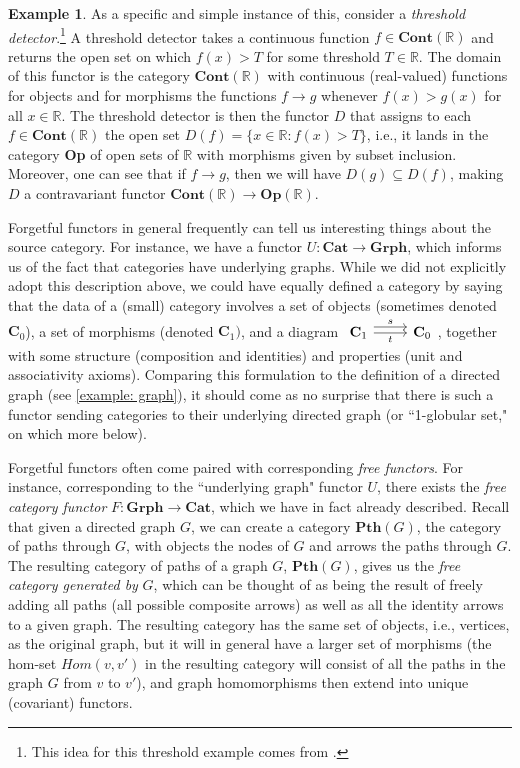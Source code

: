 \documentclass[a4paper]{book}
\theoremstyle{definition}
\newtheorem{example}{Example}[section]
\theoremstyle{definition}
\theoremstyle{definition}
\theoremstyle{theorem}
\theoremstyle{definition}
\begin{document}
\begin{example}
	As a specific and simple instance of this, consider a \textit{threshold detector}.\footnote{This idea for this threshold example comes from \cite{robinson_topological_2014}.} A threshold detector takes a continuous function $f \in \textbf{Cont}(\mathbb{R})$ and returns the open set on which $f(x) > T$ for some threshold $T \in \mathbb{R}$. The domain of this functor is the category $\textbf{Cont}(\mathbb{R})$ with continuous (real-valued) functions for objects and for morphisms the functions $f \rightarrow g$ whenever $f(x) > g(x)$ for all $x \in \mathbb{R}$. The threshold detector is then the functor $D$ that assigns to each $f \in \textbf{Cont}(\mathbb{R})$ the open set $D(f) = \{x \in \mathbb{R}: f(x) > T\}$, i.e., it lands in the category \textbf{Op} of open sets of $\mathbb{R}$ with morphisms given by subset inclusion.  Moreover, one can see that if $f \rightarrow g$, then we will have $D(g) \subseteq D(f)$, making $D$ a contravariant functor $\textbf{Cont}(\mathbb{R}) \rightarrow \textbf{Op}(\mathbb{R})$. \par 
	Forgetful functors in general frequently can tell us interesting things about the source category. For instance, we have a functor $U: \textbf{Cat} \rightarrow \textbf{Grph}$, which informs us of the fact that categories have underlying graphs. While we did not explicitly adopt this description above, we could have equally defined a category by saying that the data of a (small) category involves a set of objects (sometimes denoted $\textbf{C}_0$), a set of morphisms (denoted $\textbf{C}_1)$, and a diagram $\begin{tikzcd} \textbf{C}_1 \arrow[r, shift left = 1ex, "s"] \arrow[r, "t", swap] & \textbf{C}_0 \end{tikzcd}$, together with some structure (composition and identities) and properties (unit and associativity axioms). Comparing this formulation to the definition of a directed graph (see \ref{example: graph}), it should come as no surprise that there is such a functor sending categories to their underlying directed graph (or ``1-globular set," on which more below). \par  
	Forgetful functors often come paired with corresponding \textit{free functors}. For instance, corresponding to the ``underlying graph" functor $U$, there exists the \textit{free category functor} $F: \textbf{Grph} \rightarrow \textbf{Cat}$, which we have in fact already described. Recall that given a directed graph $G$, we can create a category $\textbf{Pth}(G)$, the category of paths through $G$, with objects the nodes of $G$ and arrows the paths through $G$. The resulting category of paths of a graph $G$, $\textbf{Pth}(G)$, gives us the \textit{free category generated by} $G$, which can be thought of as being the result of freely adding all paths (all possible composite arrows) as well as all the identity arrows to a given graph. The resulting category has the same set of objects, i.e., vertices, as the original graph, but it will in general have a larger set of morphisms (the hom-set $Hom(v,v')$ in the resulting category will consist of all the paths in the graph $G$ from $v$ to $v'$), and graph homomorphisms then extend into unique (covariant) functors. \par 

\end{example}
\end{document}
